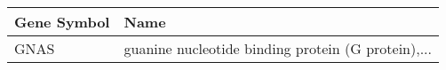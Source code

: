\begin{tabular}{ll}
\toprule
Gene Symbol &                                               Name \\
\midrule
       GNAS & guanine nucleotide binding protein (G protein),... \\
\bottomrule
\end{tabular}
